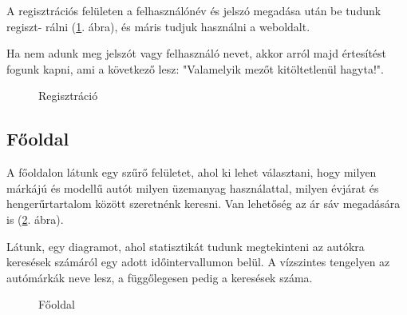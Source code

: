 A regisztrációs felületen a felhasználónév és jelszó megadása után be tudunk regiszt-
rálni (\ref{fig:Regisztráció}. ábra), és máris tudjuk használni a weboldalt.

Ha nem adunk meg jelszót vagy felhasználó nevet, akkor arról majd értesítést fogunk kapni, ami a következő lesz: "Valamelyik mezőt kitöltetlenül hagyta!".

\begin{figure}[h]
\centering
{}
\caption{Regisztráció}
\label{fig:Regisztráció}
\end{figure}

\newpage
\subsection{Főoldal}

A főoldalon látunk egy szűrő felületet, ahol ki lehet választani, hogy milyen márkájú és modellű autót milyen üzemanyag használattal, milyen évjárat és hengerűrtartalom között szeretnénk keresni. Van lehetőség az ár sáv megadására is (\ref{fig:Fooldal}. ábra).

Látunk, egy diagramot, ahol statisztikát tudunk megtekinteni az autókra keresések számáról egy adott időintervallumon belül. A vízszintes tengelyen az autómárkák neve lesz, a függőlegesen pedig a keresések száma.

\begin{figure}[h]
\centering
{}
\caption{Főoldal}
\label{fig:Fooldal}
\end{figure}

